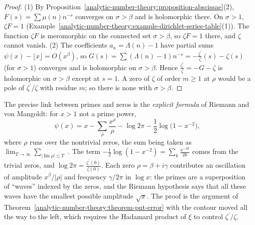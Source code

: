 \begin{proof}
(1) By Proposition~\ref{analytic-number-theory:proposition-abscissae}(2), $F(s) = \sum\mu(n)n^{-s}$ converges on $\sigma > \beta$ and is holomorphic there. On $\sigma > 1$, $\zeta F = 1$
(Example~\ref{analytic-number-theory:example-dirichlet-series-table}(1)). The function $\zeta F$ is meromorphic on the connected set $\sigma > \beta$, so $\zeta F = 1$ there, and $\zeta$ cannot vanish.
(2) The coefficients $a_n = \Lambda(n) - 1$ have partial sums $\psi(x) - \lfloor x\rfloor = O(x^\beta)$, so $G(s) = \sum(\Lambda(n) - 1)n^{-s} = -\frac{\zeta^{\prime}}{\zeta}(s) - \zeta(s)$ (for $\sigma > 1$)
converges and is holomorphic on $\sigma > \beta$. Hence $\frac{\zeta^{\prime}}{\zeta} = -G - \zeta$ is holomorphic on $\sigma > \beta$ except at $s = 1$. A zero of $\zeta$ of order $m \geq 1$ at $\rho$ would be a
pole of $\zeta^{\prime}/\zeta$ with residue $m$; so there is none with $\sigma > \beta$.
\end{proof}

\begin{remark}\label{analytic-number-theory:remark-explicit-formula}
The precise link between primes and zeros is the \emph{explicit formula} of Riemann and von Mangoldt: for $x > 1$ not a prime power,
\[
\psi(x) = x - \sum_\rho\frac{x^\rho}{\rho} - \log 2\pi - \frac12\log\bigl(1 - x^{-2}\bigr),
\]
where $\rho$ runs over the nontrivial zeros, the sum being taken as $\lim_{T \to \infty}\sum_{|\operatorname{Im}\rho| \leq T}$ \cite{davenport-multiplicative}. The term $-\frac12\log(1 - x^{-2}) = \sum_k\frac{x^{-2k}}{2k}$
comes from the trivial zeros, and $\log 2\pi = \frac{\zeta^{\prime}(0)}{\zeta(0)}$. Each zero $\rho = \beta + i\gamma$ contributes an oscillation of amplitude $x^\beta/|\rho|$ and frequency $\gamma/2\pi$ in
$\log x$: the primes are a superposition of ``waves'' indexed by the zeros, and the Riemann hypothesis says that all these waves have the smallest possible amplitude $\sqrt{x}$. The proof is the
argument of Theorem~\ref{analytic-number-theory:theorem-pnt-error} with the contour moved all the way to the left, which requires the Hadamard product of $\xi$ to control $\zeta^{\prime}/\zeta$.
\end{remark}

